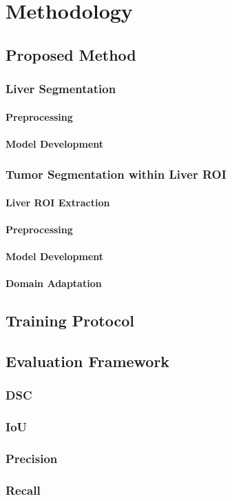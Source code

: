 \chapter{Methodology}

\section{Proposed Method}


\subsection{Liver Segmentation}


\subsubsection{Preprocessing}


\subsubsection{Model Development}


\subsection{Tumor Segmentation within Liver ROI}


\subsubsection{Liver ROI Extraction}


\subsubsection{Preprocessing}


\subsubsection{Model Development}


\subsubsection{Domain Adaptation}


\section{Training Protocol}


\section{Evaluation Framework}


\subsection{DSC}


\subsection{IoU}


\subsection{Precision}


\subsection{Recall}


